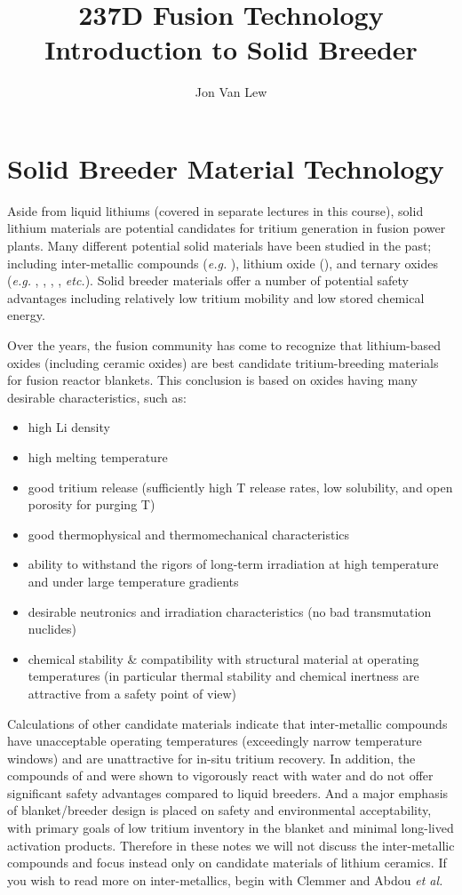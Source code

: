 \documentclass[11pt]{report} %
\title{237D Fusion Technology \\
Introduction to Solid Breeder}
\author{Jon Van Lew}
\newcommand{\lit}{\ce{Li2TiO3}}
\newcommand{\lis}{\ce{Li4SiO4}}
\newcommand{\lio}{\ce{Li2O}}
\newcommand{\liz}{\ce{Li2ZrO3}}
\newcommand{\lial}{\ce{LiAlO2}}
\begin{document}
\maketitle
\tableofcontents

\chapter{Solid Breeder Material Technology}
Aside from liquid lithiums (covered in separate lectures in this course), solid lithium materials are potential candidates for tritium generation in fusion power plants. Many different potential solid materials have been studied in the past; including inter-metallic compounds (\textit{e.g.} ), lithium oxide (\lio), and ternary oxides (\textit{e.g.} \lis, \lit, \lial, \liz, \textit{etc.}). Solid breeder materials offer a number of potential safety advantages including relatively low tritium mobility and low stored chemical energy.

Over the years, the fusion community has come to recognize that lithium-based oxides (including ceramic oxides) are best candidate tritium-breeding materials for fusion reactor blankets. This conclusion is based on oxides having many desirable characteristics, such as: 
\begin{itemize}
\item{high Li density}
\item{high melting temperature}
\item good tritium release (sufficiently high T release rates, low solubility, and open porosity for purging T)
\item good thermophysical and thermomechanical characteristics
\item ability to withstand the rigors of long-term irradiation at high temperature and under large temperature gradients
\item{desirable neutronics and irradiation characteristics (no bad transmutation nuclides)}
\item{chemical stability \& compatibility with structural material at operating temperatures (in particular thermal stability and chemical inertness are attractive from a safety point of view)}
\end{itemize}

Calculations of other candidate materials indicate that inter-metallic compounds have unacceptable operating temperatures (exceedingly narrow temperature windows) and are unattractive for in-situ tritium recovery. In addition, the compounds of  and  were shown to vigorously react with water and do not offer significant safety advantages compared to liquid breeders. And a major emphasis of blanket/breeder design is placed on safety and environmental acceptability, with primary goals of low tritium inventory in the blanket and minimal long-lived activation products. Therefore in these notes we will not discuss the inter-metallic compounds and focus instead only on candidate materials of lithium ceramics. If you wish to read more on inter-metallics, begin with Clemmer\cite{Clemmer1980} and Abdou \textit{et al.}\cite{Abdou1975c} 
\end{document}
